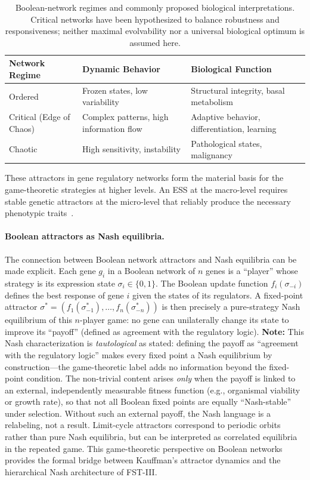 \documentclass[12pt,a4paper]{article}
\theoremstyle{remark}
\begin{document}
\begin{table}[htbp]
\centering
\caption{Boolean-network regimes and commonly proposed biological interpretations. Critical networks have been hypothesized to balance robustness and responsiveness; neither maximal evolvability nor a universal biological optimum is assumed here.}
\label{tab:network-regimes}
\begin{tabularx}{\textwidth}{@{}L{0.22\textwidth} L{0.28\textwidth} Y@{}}
\toprule
\textbf{Network Regime} & \textbf{Dynamic Behavior} & \textbf{Biological Function} \\
\midrule
Ordered & Frozen states, low variability & Structural integrity, basal metabolism \\
Critical (Edge of Chaos) & Complex patterns, high information flow & Adaptive behavior, differentiation, learning \\
Chaotic & High sensitivity, instability & Pathological states, malignancy \\
\bottomrule
\end{tabularx}
\end{table}

These attractors in gene regulatory networks form the material basis for the game-theoretic strategies at higher levels. An ESS at the macro-level requires stable genetic attractors at the micro-level that reliably produce the necessary phenotypic traits~\citep{BooleanMicroarray,KauffmanOrigins}.

\paragraph{Boolean attractors as Nash equilibria.}
The connection between Boolean network attractors and Nash equilibria can be made explicit. Each gene $g_i$ in a Boolean network of $n$ genes is a ``player'' whose strategy is its expression state $\sigma_i \in \{0, 1\}$. The Boolean update function $f_i(\sigma_{-i})$ defines the best response of gene $i$ given the states of its regulators. A fixed-point attractor $\sigma^* = (f_1(\sigma^*_{-1}), \dots, f_n(\sigma^*_{-n}))$ is then precisely a pure-strategy Nash equilibrium of this $n$-player game: no gene can unilaterally change its state to improve its ``payoff'' (defined as agreement with the regulatory logic). \textbf{Note:} This Nash characterization is \emph{tautological} as stated: defining the payoff as ``agreement with the regulatory logic'' makes every fixed point a Nash equilibrium by construction---the game-theoretic label adds no information beyond the fixed-point condition. The non-trivial content arises \emph{only} when the payoff is linked to an external, independently measurable fitness function (e.g., organismal viability or growth rate), so that not all Boolean fixed points are equally ``Nash-stable'' under selection. Without such an external payoff, the Nash language is a relabeling, not a result. Limit-cycle attractors correspond to periodic orbits rather than pure Nash equilibria, but can be interpreted as correlated equilibria in the repeated game. This game-theoretic perspective on Boolean networks provides the formal bridge between Kauffman's attractor dynamics and the hierarchical Nash architecture of FST-III.
\end{document}
